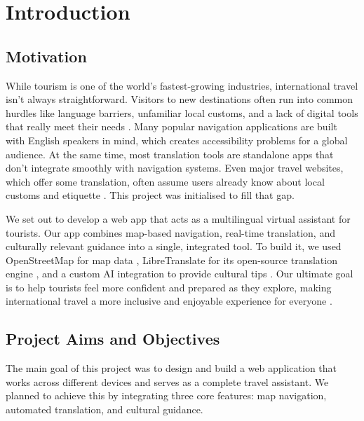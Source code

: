 \chapter{Introduction}

\section{Motivation}

While tourism is one of the world's fastest-growing industries, international travel isn't always straightforward. Visitors to new destinations often run into common hurdles like language barriers, unfamiliar local customs, and a lack of digital tools that really meet their needs \cite{Liebling2020}. Many popular navigation applications are built with English speakers in mind, which creates accessibility problems for a global audience. At the same time, most translation tools are standalone apps that don't integrate smoothly with navigation systems. Even major travel websites, which offer some translation, often assume users already know about local customs and etiquette \cite{navUX,localizationUX}. This project was initialised to fill that gap.

We set out to develop a web app that acts as a multilingual virtual assistant for tourists. Our app combines map-based navigation, real-time translation, and culturally relevant guidance into a single, integrated tool. To build it, we used OpenStreetMap for map data \cite{osm}, LibreTranslate for its open-source translation engine \cite{libretranslate}, and a custom AI integration to provide cultural tips \cite{cultureai}. Our ultimate goal is to help tourists feel more confident and prepared as they explore, making international travel a more inclusive and enjoyable experience for everyone \cite{inclusiveTourism}.

\section{Project Aims and Objectives}

The main goal of this project was to design and build a web application that works across different devices and serves as a complete travel assistant. We planned to achieve this by integrating three core features: map navigation, automated translation, and cultural guidance.

